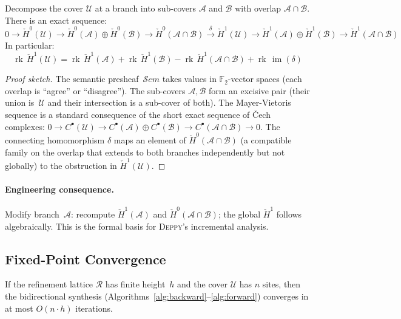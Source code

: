 \documentclass[acmsmall,screen,review,anonymous]{acmart}
\theoremstyle{remark}
\newcommand{\Sem}{\mathcal{S}\mathit{em}}
\newcommand{\Hc}[1]{\check{H}^{#1}}
\newcommand{\rk}{\operatorname{rk}}
\newcommand{\im}{\operatorname{im}}
\newcommand{\GF}{\mathbb{F}}
\begin{document}
\begin{theorem}\label{thm:mayer-vietoris}
Decompose the cover $\mathcal{U}$ at a branch into sub-covers
$\mathcal{A}$ and $\mathcal{B}$ with overlap
$\mathcal{A} \cap \mathcal{B}$.  There is an exact sequence:
\[
  0 \to \Hc{0}(\mathcal{U}) \to
  \Hc{0}(\mathcal{A}) \oplus \Hc{0}(\mathcal{B}) \to
  \Hc{0}(\mathcal{A} \cap \mathcal{B})
  \xrightarrow{\delta}
  \Hc{1}(\mathcal{U}) \to
  \Hc{1}(\mathcal{A}) \oplus \Hc{1}(\mathcal{B}) \to
  \Hc{1}(\mathcal{A} \cap \mathcal{B})
\]
In particular:
\[
  \rk\,\Hc{1}(\mathcal{U}) = \rk\,\Hc{1}(\mathcal{A})
    + \rk\,\Hc{1}(\mathcal{B})
    - \rk\,\Hc{1}(\mathcal{A} \cap \mathcal{B})
    + \rk\,\im(\delta)
\]
\end{theorem}

\begin{proof}[Proof sketch]
The semantic presheaf~$\Sem$ takes values in $\GF_2$-vector spaces
(each overlap is ``agree'' or ``disagree'').  The sub-covers
$\mathcal{A}, \mathcal{B}$ form an excisive pair (their union
is~$\mathcal{U}$ and their intersection is a sub-cover of both).
The Mayer-Vietoris sequence is a standard consequence of the
short exact sequence of \v{C}ech complexes:
$0 \to C^\bullet(\mathcal{U}) \to C^\bullet(\mathcal{A}) \oplus
C^\bullet(\mathcal{B}) \to C^\bullet(\mathcal{A} \cap \mathcal{B})
\to 0$.
The connecting homomorphism $\delta$ maps an element of
$\Hc{0}(\mathcal{A} \cap \mathcal{B})$ (a compatible family on the
overlap that extends to both branches independently but not globally)
to the obstruction in $\Hc{1}(\mathcal{U})$.
\end{proof}

\paragraph{Engineering consequence.}
Modify branch~$\mathcal{A}$: recompute $\Hc{1}(\mathcal{A})$
and $\Hc{0}(\mathcal{A} \cap \mathcal{B})$; the global $\Hc{1}$
follows algebraically.  This is the formal basis for
\textsc{Deppy}'s incremental analysis.

\subsection{Fixed-Point Convergence}\label{sec:convergence}

\begin{theorem}[Convergence]\label{thm:convergence}
If the refinement lattice $\mathcal{R}$ has finite height~$h$ and
the cover $\mathcal{U}$ has $n$ sites, then the bidirectional
synthesis (Algorithms~\ref{alg:backward}--\ref{alg:forward})
converges in at most $O(n \cdot h)$ iterations.
\end{theorem}
\end{document}
